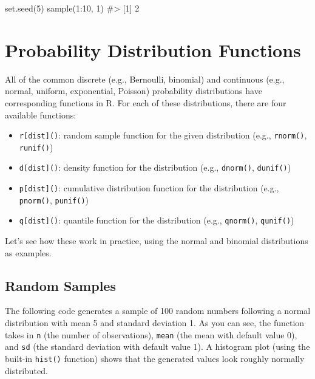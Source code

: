 \documentclass[
  letterpaper,
]{latex/krantz}
\makeatletter
\newenvironment{Shaded}{\begin{snugshade}}{\end{snugshade}}
\newcommand{\CommentTok}[1]{\textcolor[rgb]{0.37,0.37,0.37}{#1}}
\newcommand{\DecValTok}[1]{\textcolor[rgb]{0.68,0.00,0.00}{#1}}
\newcommand{\FunctionTok}[1]{\textcolor[rgb]{0.28,0.35,0.67}{#1}}
\newcommand{\NormalTok}[1]{\textcolor[rgb]{0.00,0.23,0.31}{#1}}
\newcommand{\SpecialCharTok}[1]{\textcolor[rgb]{0.37,0.37,0.37}{#1}}
\providecommand{\tightlist}{%
  \setlength{\itemsep}{0pt}\setlength{\parskip}{0pt}}\usepackage{longtable,booktabs,array}
\newenvironment{kframe}{%
\medskip{}
\setlength{\fboxsep}{.8em}
 \def\at@end@of@kframe{}%
 \ifinner\ifhmode%
  \def\at@end@of@kframe{\end{minipage}}%
  \begin{minipage}{\columnwidth}%
 \fi\fi%
 \def\FrameCommand##1{\hskip\@totalleftmargin \hskip-\fboxsep
 \colorbox{shadecolor}{##1}\hskip-\fboxsep
     \hskip-\linewidth \hskip-\@totalleftmargin \hskip\columnwidth}%
 \MakeFramed {\advance\hsize-\width
   \@totalleftmargin\z@ \linewidth\hsize
   \@setminipage}}%
 {\par\unskip\endMakeFramed%
 \at@end@of@kframe}
\renewenvironment{Shaded}{\begin{kframe}}{\end{kframe}}
\makeatother
\begin{document}
\begin{Shaded}
\begin{Highlighting}[]
\FunctionTok{set.seed}\NormalTok{(}\DecValTok{5}\NormalTok{)}
\FunctionTok{sample}\NormalTok{(}\DecValTok{1}\SpecialCharTok{:}\DecValTok{10}\NormalTok{, }\DecValTok{1}\NormalTok{)}
\CommentTok{\#\textgreater{} [1] 2}
\end{Highlighting}
\end{Shaded}

\section{\texorpdfstring{Probability Distribution Functions
}{Probability Distribution Functions }}\label{probability-distribution-functions}

All of the common discrete (e.g., Bernoulli, binomial) and continuous
(e.g., normal, uniform, exponential, Poisson) probability distributions
have corresponding functions in R. For each of these distributions,
there are four available functions:

\begin{itemize}
\tightlist
\item
  \texttt{r{[}dist{]}()}: random sample function for the given
  distribution (e.g., \texttt{rnorm()}, \texttt{runif()})
\item
  \texttt{d{[}dist{]}()}: density function for the distribution (e.g.,
  \texttt{dnorm()}, \texttt{dunif()})
\item
  \texttt{p{[}dist{]}()}: cumulative distribution function for the
  distribution (e.g., \texttt{pnorm()}, \texttt{punif()})
\item
  \texttt{q{[}dist{]}()}: quantile function for the distribution (e.g.,
  \texttt{qnorm()}, \texttt{qunif()})
\end{itemize}

Let's see how these work in practice, using the normal and binomial
distributions as examples.

\subsection{\texorpdfstring{Random Samples
}{Random Samples   }}\label{random-samples}

The following code generates a sample of 100 random numbers following a
normal distribution with mean 5 and standard deviation 1. As you can
see, the function takes in \texttt{n} (the number of observations),
\texttt{mean} (the mean with default value 0), and \texttt{sd} (the
standard deviation with default value 1). A histogram plot (using the
built-in \texttt{hist()} function) shows that the generated values look
roughly normally distributed.
\end{document}
